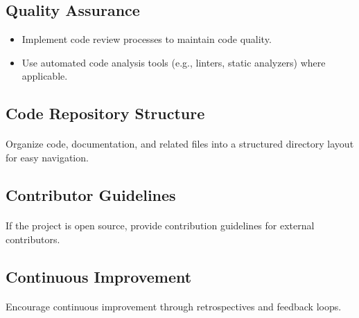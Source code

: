 \documentclass{article}
\begin{document}
\subsection{Quality Assurance}
\begin{itemize}
    \item Implement code review processes to maintain code quality.
    \item Use automated code analysis tools (e.g., linters, static analyzers) where applicable.
\end{itemize}

\subsection{Code Repository Structure}
\paragraph{}
Organize code, documentation, and related files into a structured directory layout for easy navigation.

\subsection{Contributor Guidelines}
\paragraph{}
If the project is open source, provide contribution guidelines for external contributors.

\subsection{Continuous Improvement}
\paragraph{}
Encourage continuous improvement through retrospectives and feedback loops.
\end{document}
